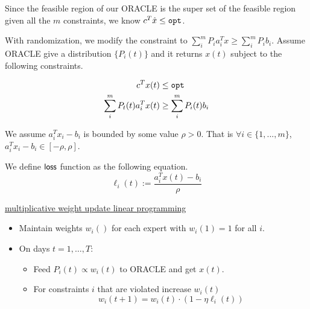 \documentclass[11pt]{article}
\begin{document}
Since the feasible region of our ORACLE is the super set of the feasible region given all the $m$ constraints, we know $c^T \hat{x} \leq {\tt opt}$.

With randomization, we modify the constraint to $\sum_i^m P_i a_i^T x \geq \sum_i^m P_i b_i$.
Assume ORACLE give a distribution $\{ P_i(t)\}$ and it returns $x(t)$ subject to the following constraints.

\begin{equation}
\label{equ:oracle_definition}
\begin{aligned}
c^T x(t) & \leq {\tt opt} \\
\sum_i^m P_t(t) a_i^T x(t) &\geq \sum_i^m P_i(t) b_i
\end{aligned}
\end{equation}

We assume $a_i^T x_i - b_i$ is bounded by some value $\rho > 0$.
That is $\forall i\in \{1, ..., m\}$, $a_i^T x_i - b_i \in [-\rho, \rho]$.


We define $\mathsf{loss}$ function as the following equation.
\begin{equation}
\label{equ:loss_definition}
\ell_i(t) := \frac{a_i^T x(t) - b_i}{\rho}
\end{equation}

\begin{mdframed}[backgroundcolor=blue!05,topline=false,bottomline=false,leftline=false,rightline=false] 
    \underline{\sc multiplicative weight update linear programming}
    \begin{itemize}
        \item Maintain weights $w_i()$ for each expert with $w_i(1) = 1$ for all $i$.
        \item On days $t=1,\ldots, T$:
        \begin{itemize}
            \item Feed $P_i(t) \propto w_i(t)$ to ORACLE and get $x(t)$.
            \item For constraints $i$ that are violated increase $w_i(t)$
            \begin{equation}
            \label{eq:halving}
            w_i(t+1) = w_i(t)\cdot (1 - \eta \ell_i(t))
            \end{equation}
            
        \end{itemize} 
    \end{itemize}
\end{mdframed}
\end{document}
